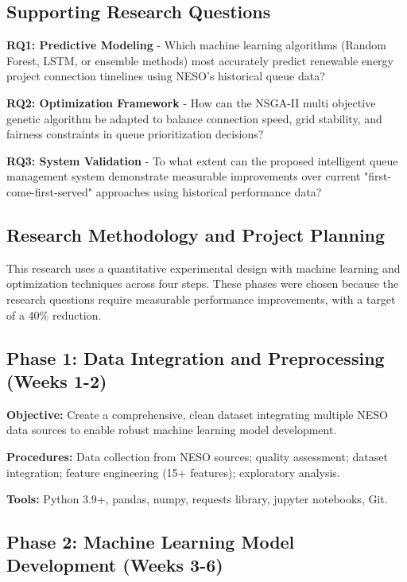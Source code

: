 \documentclass[12pt,a4paper]{article}
\begin{document}
\subsection{Supporting Research Questions}

\textbf{RQ1: Predictive Modeling} - Which machine learning algorithms (Random Forest, LSTM, or ensemble methods) most accurately predict renewable energy project connection timelines using NESO's historical queue data?

\textbf{RQ2: Optimization Framework} - How can the NSGA-II multi objective genetic algorithm be adapted to balance connection speed, grid stability, and fairness constraints in queue prioritization decisions?

\textbf{RQ3: System Validation} - To what extent can the proposed intelligent queue management system demonstrate measurable improvements over current "first-come-first-served" approaches using historical performance data?

\subsection{Research Methodology and Project Planning}

This research uses a quantitative experimental design with machine learning and optimization techniques across four steps. These phases were chosen because the research questions require measurable performance improvements, with a target of a 40\% reduction.

\subsection{Phase 1: Data Integration and Preprocessing (Weeks 1-2)}

\textbf{Objective:} Create a comprehensive, clean dataset integrating multiple NESO data sources to enable robust machine learning model development.

\textbf{Procedures:} Data collection from NESO sources; quality assessment; dataset integration; feature engineering (15+ features); exploratory analysis.

\textbf{Tools:} Python 3.9+, pandas, numpy, requests library, jupyter notebooks, Git.

\subsection{Phase 2: Machine Learning Model Development (Weeks 3-6)}
\end{document}
